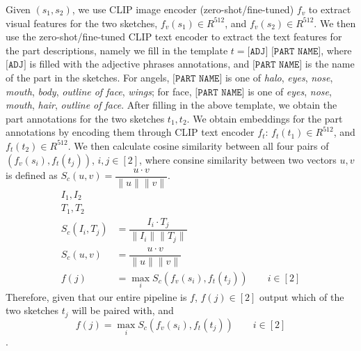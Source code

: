 Given $(s_1,s_2)$, we use CLIP image encoder (zero-shot/fine-tuned) $f_v$ to extract visual features for the two sketches,  $f_v(s_1) \in {R}^{512}$, and $f_v(s_2) \in {R}^{512}$. We then use the zero-shot/fine-tuned CLIP text encoder to extract the text features for the part descriptions, namely we fill in the template $t = \texttt{[ADJ] [PART NAME]}$, where $\texttt{[ADJ]}$ is filled with the adjective phrases annotations, and $\texttt{[PART NAME]}$ is the name of the part in the sketches. For angels, $\texttt{[PART NAME]}$ is one of \textit{halo}, \textit{eyes}, \textit{nose}, \textit{mouth}, \textit{body}, \textit{outline of face}, \textit{wings}; for face, $\texttt{[PART NAME]}$ is one of \textit{eyes}, \textit{nose}, \textit{mouth}, \textit{hair}, \textit{outline of face}. After filling in the above template, we obtain the part annotations for the two sketches $t_1,t_2$.  
We obtain embeddings for the part annotations by encoding them through CLIP text encoder $f_t$: $f_t(t_1) \in {R}^{512}$, and $f_t(t_2) \in {R}^{512}$. We then calculate cosine similarity between all four pairs of $(f_v(s_i), f_t(t_j))$, $i,j \in [2]$, where consine similarity between two vectors $u,v$ is defined as $S_c(u,v) = \dfrac{u \cdot v}{\|u\| \|v\|}$. 
\begin{equation}
    \begin{split}
        I_1, I_2 \\
        T_1, T_2 \\
        S_c(I_i,T_j) & = \dfrac{I_i \cdot T_j}{\|I_i\| \|T_j\|} \\
        S_c(u,v) & = \dfrac{u \cdot v}{\|u\| \|v\|} \\
        f(j) & = \max_{i} S_c(f_v(s_i), f_t(t_j)) \hspace{2em} i \in [2]
    \end{split}
\end{equation}
Therefore, given that our entire pipeline is $f$, $f(j) \in [2]$ output which of the two sketches $t_j$ will be paired with, and $$f(j) = \max_{i} S_c(f_v(s_i), f_t(t_j)) \hspace{2em} i \in [2]$$.    



